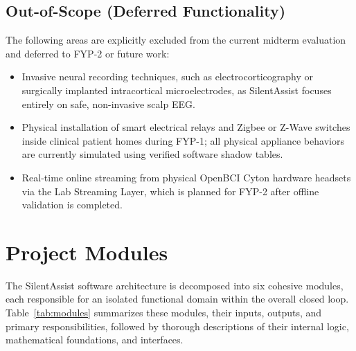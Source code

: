\documentclass[12pt,a4paper]{report}
\begin{document}
\subsection{Out-of-Scope (Deferred Functionality)}
The following areas are explicitly excluded from the current midterm evaluation and deferred to FYP-2 or future work:
\begin{itemize}[leftmargin=1.5em]
    \item Invasive neural recording techniques, such as electrocorticography or surgically implanted intracortical microelectrodes, as SilentAssist focuses entirely on safe, non-invasive scalp EEG.
    \item Physical installation of smart electrical relays and Zigbee or Z-Wave switches inside clinical patient homes during FYP-1; all physical appliance behaviors are currently simulated using verified software shadow tables.
    \item Real-time online streaming from physical OpenBCI Cyton hardware headsets via the Lab Streaming Layer, which is planned for FYP-2 after offline validation is completed.
\end{itemize}

\section{Project Modules}
The SilentAssist software architecture is decomposed into six cohesive modules, each responsible for an isolated functional domain within the overall closed loop. Table~\ref{tab:modules} summarizes these modules, their inputs, outputs, and primary responsibilities, followed by thorough descriptions of their internal logic, mathematical foundations, and interfaces.
\end{document}
